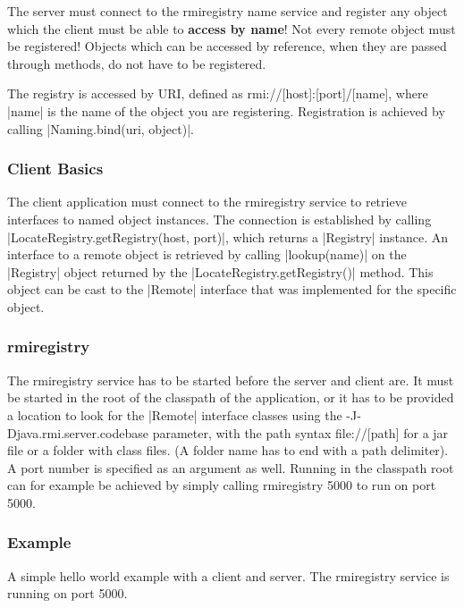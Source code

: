 \documentclass[a4paper]{article}
\begin{document}
The server must connect to the rmiregistry name service and register any object which the client must be able to \textbf{access by name}! Not every remote object must be registered! Objects which can be accessed by reference, when they are passed through methods, do not have to be registered.

The registry is accessed by URI, defined as {\small\ttfamily rmi://[host]:[port]/[name]}, where |name| is the name of the object you are registering. Registration is achieved by calling |Naming.bind(uri, object)|.

\subsubsection{Client Basics}

The client application must connect to the rmiregistry service to retrieve interfaces to named object instances. The connection is established by calling |LocateRegistry.getRegistry(host, port)|, which returns a |Registry| instance. An interface to a remote object is retrieved by calling |lookup(name)| on the |Registry| object returned by the |LocateRegistry.getRegistry()| method. This object can be cast to the |Remote| interface that was implemented for the specific object.

\subsubsection{rmiregistry}

The rmiregistry service has to be started before the server and client are. It must be started in the root of the classpath of the application, or it has to be provided a location to look for the |Remote| interface classes using the {\small\ttfamily -J-Djava.rmi.server.codebase} parameter, with the path syntax {\small\ttfamily file://[path]} for a jar file or a folder with class files. (A folder name has to end with a path delimiter). A port number is specified as an argument as well. Running in the classpath root can for example be achieved by simply calling {\small\ttfamily rmiregistry 5000} to run on port 5000.

\subsubsection{Example}

A simple hello world example with a client and server. The rmiregistry service is running on port 5000.
\end{document}
